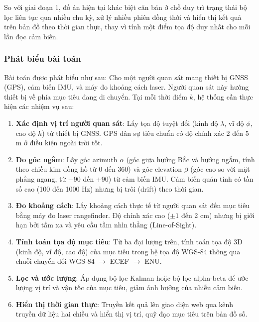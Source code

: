 So với giai đoạn 1, đồ án hiện tại khác biệt căn bản ở chỗ duy trì trạng thái bộ lọc liên tục qua nhiều chu kỳ, xử lý nhiều phiên đồng thời và hiển thị kết quả trên bản đồ theo thời gian thực, thay vì tính một điểm tọa độ duy nhất cho mỗi lần đọc cảm biến.
\subsubsection{Phát biểu bài toán}

\hspace{0.5cm} Bài toán được phát biểu như sau: Cho một người quan sát mang thiết bị GNSS (GPS), cảm biến IMU, và máy đo khoảng cách laser. Người quan sát này hướng thiết bị về phía mục tiêu đang di chuyển. Tại mỗi thời điểm $k$, hệ thống cần thực hiện các nhiệm vụ sau:

\begin{enumerate}
    \item \textbf{Xác định vị trí người quan sát}: Lấy tọa độ tuyệt đối (kinh độ $\lambda$, vĩ độ $\phi$, cao độ $h$) từ thiết bị GNSS. GPS dân sự tiêu chuẩn có độ chính xác 2 đến 5 m ở điều kiện ngoài trời tốt.
    \item \textbf{Đo góc ngắm}: Lấy góc azimuth $\alpha$ (góc giữa hướng Bắc và hướng ngắm, tính theo chiều kim đồng hồ từ 0\textdegree{} đến 360\textdegree{}) và góc elevation $\beta$ (góc cao so với mặt phẳng ngang, từ $-90$\textdegree{} đến $+90$\textdegree{}) từ cảm biến IMU. Cảm biến quán tính có tần số cao (100 đến 1000 Hz) nhưng bị trôi (drift) theo thời gian.
    \item \textbf{Đo khoảng cách}: Lấy khoảng cách thực tế từ người quan sát đến mục tiêu bằng máy đo laser rangefinder. Độ chính xác cao ($\pm 1$ đến 2 cm) nhưng bị giới hạn bởi tầm xa và yêu cầu tầm nhìn thẳng (Line-of-Sight).
    \item \textbf{Tính toán tọa độ mục tiêu}: Từ ba đại lượng trên, tính toán tọa độ 3D (kinh độ, vĩ độ, cao độ) của mục tiêu trong hệ tọa độ WGS-84 thông qua chuỗi chuyển đổi WGS-84 $\rightarrow$ ECEF $\rightarrow$ ENU.
    \item \textbf{Lọc và ước lượng}: Áp dụng bộ lọc Kalman \cite{kalman1961new} hoặc bộ lọc alpha-beta để ước lượng vị trí và vận tốc của mục tiêu, giảm ảnh hưởng của nhiễu cảm biến.
    \item \textbf{Hiển thị thời gian thực}: Truyền kết quả lên giao diện web qua kênh truyền dữ liệu hai chiều và hiển thị vị trí, quỹ đạo mục tiêu trên bản đồ số.
\end{enumerate}

